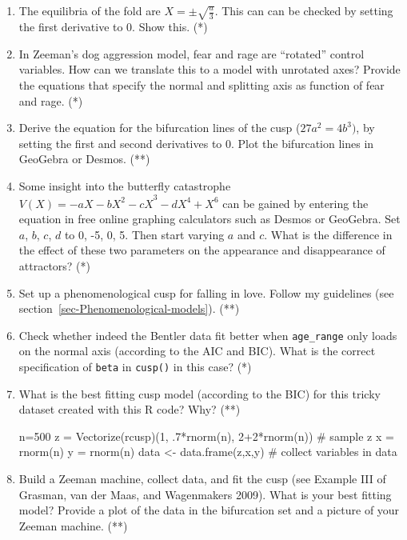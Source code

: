 \documentclass[
  a4paper,
  DIV=11,
  numbers=noendperiod,
  oneside]{scrreprt}
\newenvironment{Shaded}{}{}
\newcommand{\CommentTok}[1]{\textcolor[rgb]{0.42,0.45,0.49}{#1}}
\newcommand{\DecValTok}[1]{\textcolor[rgb]{0.00,0.36,0.77}{#1}}
\newcommand{\FunctionTok}[1]{\textcolor[rgb]{0.44,0.26,0.76}{#1}}
\newcommand{\NormalTok}[1]{\textcolor[rgb]{0.14,0.16,0.18}{#1}}
\newcommand{\OtherTok}[1]{\textcolor[rgb]{0.44,0.26,0.76}{#1}}
\newcommand{\SpecialCharTok}[1]{\textcolor[rgb]{0.00,0.36,0.77}{#1}}
\begin{document}
\begin{enumerate}
\def\labelenumi{\arabic{enumi})}
\item
  The equilibria of the fold are \(X = \pm \sqrt{\frac{a}{3}}\). This
  can can be checked by setting the first derivative to 0. Show this.
  (*)
\item
  In Zeeman's dog aggression model, fear and rage are ``rotated''
  control variables. How can we translate this to a model with unrotated
  axes? Provide the equations that specify the normal and splitting axis
  as function of fear and rage. (*)
\item
  Derive the equation for the bifurcation lines of the cusp
  (\(27a^{2} = 4b^{3})\), by setting the first and second derivatives to
  0. Plot the bifurcation lines in GeoGebra or Desmos. (**)
\item
  Some insight into the butterfly catastrophe
  \(V(X) = {- aX - bX^{2} - cX}^{3} - dX^{4} + X^{6}\) can be gained by
  entering the equation in free online graphing calculators such as
  Desmos or GeoGebra. Set \(a\), \(b\), \(c\), \(d\) to 0, -5, 0, 5.
  Then start varying \(a\) and \(c\). What is the difference in the
  effect of these two parameters on the appearance and disappearance of
  attractors? (*)
\item
  Set up a phenomenological cusp for falling in love. Follow my
  guidelines (see section~\ref{sec-Phenomenological-models}). (**)
\item
  Check whether indeed the Bentler data fit better when
  \texttt{age\_range} only loads on the normal axis (according to the
  AIC and BIC). What is the correct specification of \texttt{beta} in
  \texttt{cusp()} in this case? (*)
\item
  What is the best fitting cusp model (according to the BIC) for this
  tricky dataset created with this R code? Why? (**)

\begin{Shaded}
\begin{Highlighting}[]
\NormalTok{n}\OtherTok{=}\DecValTok{500}
\NormalTok{z }\OtherTok{=} \FunctionTok{Vectorize}\NormalTok{(rcusp)(}\DecValTok{1}\NormalTok{, .}\DecValTok{7}\SpecialCharTok{*}\FunctionTok{rnorm}\NormalTok{(n), }\DecValTok{2}\SpecialCharTok{+}\DecValTok{2}\SpecialCharTok{*}\FunctionTok{rnorm}\NormalTok{(n)) }\CommentTok{\# sample z }
\NormalTok{x }\OtherTok{=} \FunctionTok{rnorm}\NormalTok{(n) }
\NormalTok{y }\OtherTok{=} \FunctionTok{rnorm}\NormalTok{(n) }
\NormalTok{data }\OtherTok{\textless{}{-}} \FunctionTok{data.frame}\NormalTok{(z,x,y) }\CommentTok{\# collect variables in data}
\end{Highlighting}
\end{Shaded}
\item
  Build a Zeeman machine, collect data, and fit the cusp (see Example
  III of Grasman, van der Maas, and Wagenmakers 2009). What is your best
  fitting model? Provide a plot of the data in the bifurcation set and a
  picture of your Zeeman machine. (**)
\end{enumerate}
\end{document}
